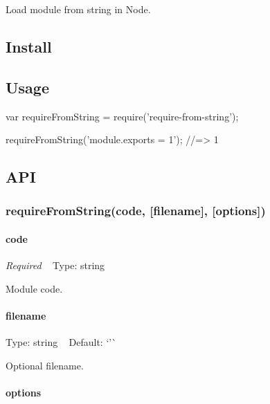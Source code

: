 Load module from string in Node.

\subsection*{Install}




\subsection*{Usage}


\begin{DoxyCode}
var requireFromString = require('require-from-string');

requireFromString('module.exports = 1');
//=> 1
\end{DoxyCode}


\subsection*{A\+PI}

\subsubsection*{require\+From\+String(code, \mbox{[}filename\mbox{]}, \mbox{[}options\mbox{]})}

\paragraph*{code}

{\itshape Required} ~\newline
Type\+: {\ttfamily string}

Module code.

\paragraph*{filename}

Type\+: {\ttfamily string} ~\newline
Default\+: `'\textquotesingle{}\`{}

Optional filename.

\paragraph*{options}

